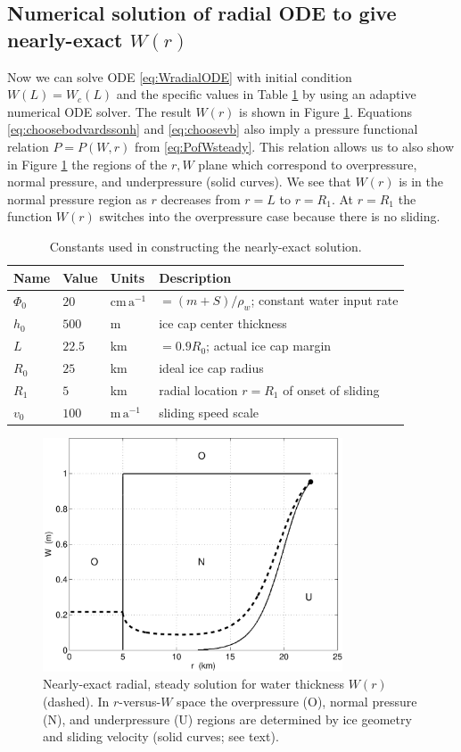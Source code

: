 \documentclass[11pt,final]{amsart}
\begin{document}
\subsection*{Numerical solution of radial ODE to give nearly-exact $W(r)$}  Now we can solve ODE \eqref{eq:WradialODE} with initial condition $W(L)=W_c(L)$ and the specific values in Table \ref{tab:verifconstants} by using an adaptive numerical ODE solver.  The result $W(r)$ is shown in Figure \ref{fig:Wexact}.  Equations \eqref{eq:choosebodvardssonh} and \eqref{eq:choosevb} also imply a pressure functional relation $P=P(W,r)$ from \eqref{eq:PofWsteady}.  This relation allows us to also show in Figure \ref{fig:Wexact} the regions of the $r,W$ plane which correspond to overpressure, normal pressure, and underpressure (solid curves).  We see that $W(r)$ is in the normal pressure region as $r$ decreases from $r=L$ to $r=R_1$.  At $r=R_1$ the function $W(r)$ switches into the overpressure case because there is no sliding.

\begin{table}[ht]
  \centering
  \caption{Constants used in constructing the nearly-exact solution.}
  \begin{tabular}{lllp{3.0in}}
    \textbf{Name} & \textbf{Value} & \textbf{Units} & \textbf{Description}\\
\hline
    $\Phi_0$ & $20$ & $\text{cm}\,\text{a}^{-1}$ & $=(m+S)/\rho_w$; constant water input rate \\
    $h_0$ & $500$ & m & ice cap center thickness \\
    $L$   & $22.5$& km & $=0.9 R_0$; actual ice cap margin \\
    $R_0$ & $25$  & km & ideal ice cap radius \\
    $R_1$ & $5$   & km & radial location $r=R_1$ of onset of sliding \\
    $v_0$ & $100$ & $\text{m}\,\text{a}^{-1}$ & sliding speed scale \\
    \hline
  \end{tabular}
 \label{tab:verifconstants}
\end{table}

\begin{figure}[ht]
\includegraphics[width=3.5in,keepaspectratio=true]{exact-W-plot-onu}
\caption{Nearly-exact radial, steady solution for water thickness $W(r)$ (dashed).  In $r$-versus-$W$ space the overpressure (O), normal pressure (N), and underpressure (U) regions are determined by ice geometry and sliding velocity (solid curves; see text).}
\label{fig:Wexact}
\end{figure}
\end{document}

